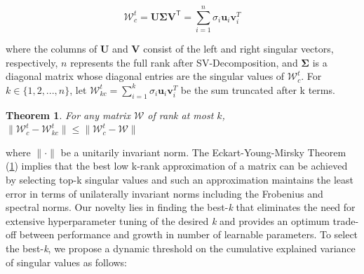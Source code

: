 \documentclass[10pt]{article} %
\newtheorem{theorem}{Theorem}[section]
\begin{document}
\begin{equation}
\label{eqn:svd}
\mathcal{W}_c^t =\mathbf {U \Sigma V^{\mathsf{T}}} = \sum_{i=1}^{n} \sigma_i \mathbf{u}_i \mathbf{v}_i^{T}
\end{equation}


where the columns of $\mathbf{U}$ and $\mathbf{V}$ consist of the left and right singular
vectors, respectively, $n$ represents the full rank after SV-Decomposition, and $\mathbf{\Sigma}$ is a diagonal matrix whose diagonal entries are the singular
values of $\mathcal{W}_c^t$.  For $k \in \{1, 2, . . . , n\}$, let $\mathcal{W}_{kc}^{t} = \sum_{i=1}^{k} \sigma_i \mathbf{u}_i \mathbf{v}_i^{T}$ be the sum truncated after k terms.

\begin{theorem}
\label{EYM_theorem}
For any matrix $\mathcal{W}$ of rank at most $k$, $\| \mathcal{W}_{c}^{t} - \mathcal{W}_{kc}^{t} \| \leq \| \mathcal{W}_{c}^{t} - \mathcal{W} \|$

\end{theorem}

where \( \| \cdot \| \) be a unitarily invariant norm. The Eckart-Young-Mirsky Theorem (\ref{EYM_theorem}) implies that the best low k-rank approximation of a matrix can be achieved by selecting top-k singular values and such an approximation maintains the least error in terms of unilaterally invariant norms including the Frobenius and spectral norms. Our novelty lies in finding the best-\textit{k} that eliminates the need for extensive hyperparameter tuning of the desired \textit{k} and provides an optimum trade-off between performance and growth in number of learnable parameters. To select the best-\textit{k}, we propose a dynamic threshold on the cumulative explained variance of singular values as follows: 

\end{document}
